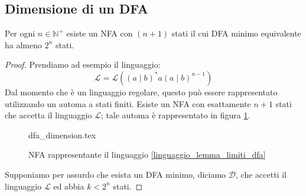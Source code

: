 \documentclass[class=book, crop=false, oneside, 12pt]{standalone}
\begin{document}
\subsection{Dimensione di un DFA}
\begin{lemma}
    Per ogni \(n \in  \mathbb{N}^+\) esiste un NFA con \((n+1)\) stati il cui DFA minimo equivalente ha almeno \(2^n\) stati.
\end{lemma}
\begin{proof}
    Prendiamo ad esempio il linguaggio:
    \begin{equation}
        \mathcal{L} = \mathcal{L}((a\mid b)^\ast a (a\mid b)^{n-1})  
        \label{linguaggio_lemma_limiti_dfa}
    \end{equation}
    Dal momento che è un linguaggio regolare, questo può essere rappresentato utilizzando un automa a stati finiti. Esiste un NFA con esattamente \(n+1\) stati che accetta il linguaggio \(\mathcal{L}\); tale automa è rappresentato in figura \ref{nfa_lemma_limiti_dfa}.
    \begin{figure}[H]
        \centering
        {dfa_dimension.tex}
        \caption{NFA rappresentante il linguaggio \ref{linguaggio_lemma_limiti_dfa}}
        \label{nfa_lemma_limiti_dfa}
    \end{figure}
    Supponiamo per assurdo che esista un DFA minimo, diciamo \(\mathcal{D}\), che accetti il linguaggio \(\mathcal{L}\) ed abbia \(k<2^n\) stati.


\end{proof}
\end{document}
